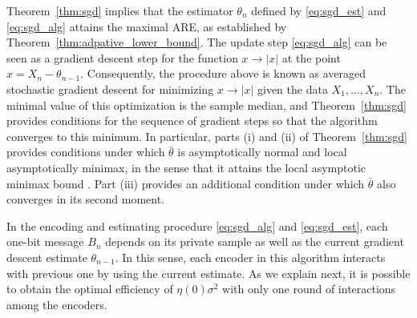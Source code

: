   
Theorem~\ref{thm:sgd} implies that the estimator ${\theta}_n$ defined by \eqref{eq:sgd_est} and \eqref{eq:sgd_alg} attains the maximal ARE, as established by Theorem~\ref{thm:adpative_lower_bound}. %
%
The update step \eqref{eq:sgd_alg} can be seen as a gradient descent step for the function $x\to |x|$ at the point $x=X_n - \theta_{n-1}$. Consequently, the procedure above is known as averaged stochastic gradient descent for minimizing $x \to |x|$ given the data $X_1,\ldots,X_n$. The minimal value of this optimization is the sample median, and Theorem~\ref{thm:sgd} provides conditions for the sequence of gradient steps so that the algorithm converges to this minimum. In particular, parts (i) and (ii) of Theorem~\ref{thm:sgd} provides conditions under which $\bar{\theta}$ is asymptotically normal and local asymptotically minimax, in the sense that it attains the local asymptotic minimax bound \cite{van2000asymptotic}. Part (iii) provides an additional condition under which $\bar{\theta}$ also converges in its second moment. 
 \par
In the encoding and estimating procedure \eqref{eq:sgd_alg} and \eqref{eq:sgd_est}, each one-bit message $B_n$ depends on its private sample as well as the current gradient descent estimate $\theta_{n-1}$. In this sense, each encoder in this algorithm interacts with previous one by using the current estimate.
%
As we explain next, 
it is possible to obtain the optimal efficiency of $\eta(0)\sigma^2$ with only one round of interactions among the encoders. 


